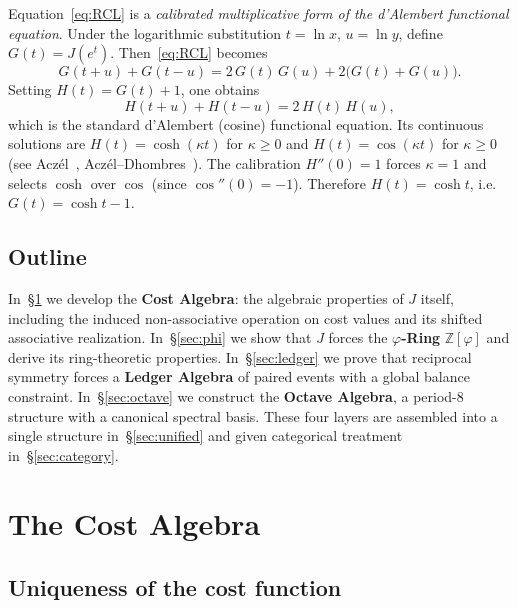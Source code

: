\documentclass[11pt,a4paper]{article}
\theoremstyle{plain}
\theoremstyle{definition}
\theoremstyle{remark}
\newcommand{\phig}{\varphi}
\newcommand{\Jcost}{J}
\newcommand{\ZZ}{\mathbb{Z}}
\begin{document}
Equation~\eqref{eq:RCL} is a \emph{calibrated multiplicative form of
the d'Alembert functional equation}.  Under the logarithmic
substitution $t=\ln x$, $u=\ln y$, define $G(t)=\Jcost(e^t)$.
Then~\eqref{eq:RCL} becomes
\begin{equation}\label{eq:Gcosh}
  G(t{+}u)+G(t{-}u)=2\,G(t)\,G(u)+2\bigl(G(t)+G(u)\bigr).
\end{equation}
Setting $H(t)=G(t)+1$, one obtains
\begin{equation}\label{eq:dAlembert}
  H(t{+}u)+H(t{-}u)=2\,H(t)\,H(u),
\end{equation}
which is the standard d'Alembert (cosine) functional equation.
Its continuous solutions are $H(t)=\cosh(\kappa t)$ for $\kappa\ge0$
and $H(t)=\cos(\kappa t)$ for $\kappa\ge0$
(see Acz\'el~\cite{aczel1966}, Acz\'el--Dhombres~\cite{aczel_dhombres1989}).
The calibration $H''(0)=1$ forces $\kappa=1$ and selects $\cosh$ over
$\cos$ (since $\cos''(0)=-1$).  Therefore $H(t)=\cosh t$,
i.e.\ $G(t)=\cosh t-1$.

\subsection{Outline}

In~\S\ref{sec:cost} we develop the \textbf{Cost Algebra}: the algebraic
properties of $\Jcost$ itself, including the induced non-associative
operation on cost values and its shifted associative realization.
In~\S\ref{sec:phi} we show that $\Jcost$ forces the
\textbf{$\phig$-Ring} $\ZZ[\phig]$ and derive its ring-theoretic
properties.  In~\S\ref{sec:ledger} we prove that reciprocal symmetry
forces a \textbf{Ledger Algebra} of paired events with a global balance
constraint.  In~\S\ref{sec:octave} we construct the
\textbf{Octave Algebra}, a period-8 structure with a canonical spectral
basis.  These four layers are assembled into a single structure
in~\S\ref{sec:unified} and given categorical treatment
in~\S\ref{sec:category}.


\section{The Cost Algebra}\label{sec:cost}

\subsection{Uniqueness of the cost function}
\end{document}
